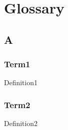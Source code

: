 \section{Glossary}
	\subsection*{A}
		\subsubsection*{Term1}
		Definition1
		\subsubsection*{Term2}
		Definition2
	